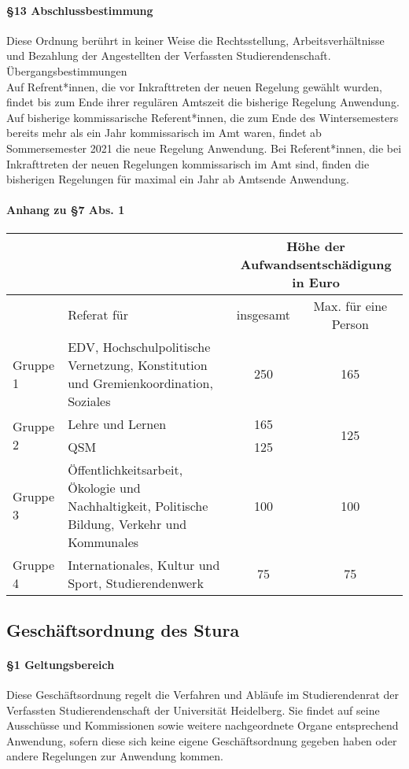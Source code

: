     \paragraph{§13 Abschlussbestimmung}
        Diese Ordnung berührt in keiner Weise die Rechtsstellung, Arbeitsverhältnisse und Bezahlung der Angestellten der Verfassten Studierendenschaft.\\
        Übergangsbestimmungen\\
        Auf Refrent*innen, die vor Inkrafttreten der neuen Regelung gewählt wurden, findet bis zum Ende ihrer regulären Amtszeit die bisherige Regelung Anwendung. \\
        Auf bisherige kommissarische Referent*innen, die zum Ende des Wintersemesters bereits mehr als ein Jahr kommissarisch im Amt waren, findet ab Sommersemester 2021 die neue Regelung Anwendung. Bei Referent*innen, die bei Inkrafttreten der neuen Regelungen kommissarisch im Amt sind, finden die bisherigen Regelungen für maximal ein Jahr ab Amtsende Anwendung.
    \paragraph{Anhang zu §7 Abs. 1}
        \begin{tabular}{|l|p{7cm}|c|c|}
            \hline
            &&\multicolumn{2}{|c|}{Höhe der Aufwandsentschädigung in Euro}\\\hline
            &Referat für & insgesamt & Max. für eine Person \\\hline\hline
            Gruppe 1&EDV, Hochschulpolitische Vernetzung, Konstitution und Gremienkoordination, Soziales&250&165\\\hline
            \multirow{2}{*}{Gruppe 2}&Lehre und Lernen&165&\multirow{2}{*}{125}\\\cline{2-2}
            &QSM&125&\\\hline
            Gruppe 3 & Öffentlichkeitsarbeit, Ökologie und Nachhaltigkeit, Politische Bildung, Verkehr und Kommunales & 100 & 100\\\hline
            Gruppe 4 & Internationales, Kultur und Sport, Studierendenwerk & 75 & 75\\\hline
        \end{tabular}
\subsection{Geschäftsordnung des Stura\label{appendix:4}}
    \paragraph{§1 Geltungsbereich}
        Diese Geschäftsordnung regelt die Verfahren und Abläufe im Studierendenrat der Verfassten Studierendenschaft der Universität Heidelberg. Sie findet auf seine Ausschüsse und Kommissionen sowie weitere nachgeordnete Organe entsprechend Anwendung, sofern diese sich keine eigene Geschäftsordnung gegeben haben oder andere Regelungen zur Anwendung kommen.
